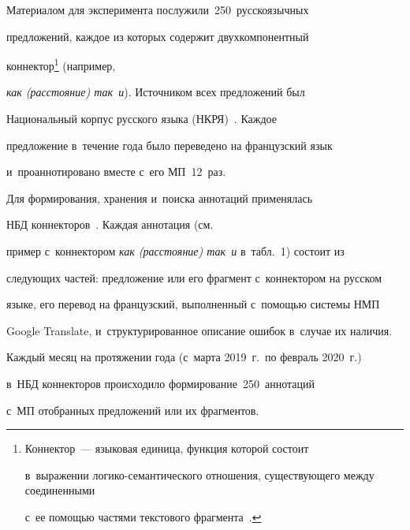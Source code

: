    Материалом для эксперимента послужили~250~русскоязычных 


предложений, каждое из которых содержит двухкомпонентный 


коннектор\footnote{Коннектор~--- языковая единица, функция которой состоит 


в~выражении ло\-ги\-ко-се\-ман\-ти\-че\-ско\-го отношения, су\-щест\-ву\-юще\-го между соединенными 


с~ее по\-мощью час\-тя\-ми текс\-то\-во\-го фрагмента~\cite[с.~17]{7-ez}.} (например, 


\textit{как (расстояние) так~и}). Источником всех предложений был 


Национальный корпус русского языка (НКРЯ)~\cite{8-ez}. Каждое 


предложение в~течение года было переведено на французский язык 


и~проаннотировано вместе с~его МП~12~раз.













   


   Для формирования, хранения и~поиска аннотаций применялась 


НБД коннекторов~\cite{9-ez, 10-ez, 11-ez, 12-ez, 13-ez}. Каждая аннотация (см.\ 


пример с~коннектором \textit{как (расстояние) так~и} в~табл.~1) состоит из 


сле\-ду\-ющих частей: предложение или его фрагмент с~коннектором на русском 


языке, его перевод на французский, выполненный с~по\-мощью сис\-те\-мы НМП 


Google Translate, и~структурированное описание ошибок в~случае их наличия.








   


   Каждый месяц на протяжении года (с~марта 2019~г.\ по февраль 2020~г.)\ 


в~НБД коннекторов происходило формирование~250~аннотаций 


с~МП отобранных предложений или их фрагментов. 


